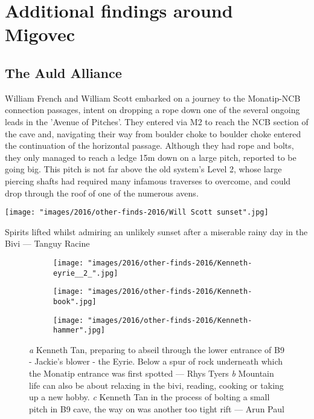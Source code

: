 \section{Additional findings around Migovec}

\subsection{The Auld Alliance}
William French and William Scott embarked on a journey to the Monatip-NCB connection passages, intent on dropping a rope down one of the several ongoing leads in the 'Avenue of Pitches'. They entered via M2 to reach the NCB section of the cave and, navigating their way from boulder choke to boulder choke entered the continuation of the horizontal passage. Although they had rope and bolts, they only managed to reach a ledge 15m down on a large pitch, reported to be going big. This pitch is not far above the old system's Level 2, whose large piercing shafts had required many infamous traverses to overcome, and could drop through the roof of one of the numerous avens.

\begin{marginfigure}
\checkoddpage \ifoddpage \forcerectofloat \else \forceversofloat \fi
\centering
 \texttt{[image: "images/2016/other-finds-2016/Will Scott sunset".jpg]} 
 \caption{Spirits lifted whilst admiring an unlikely sunset after a miserable rainy day in the Bivi --- Tanguy Racine}
 \label{Sunset}
\end{marginfigure}


\begin{figure*}[t!]
\checkoddpage \ifoddpage \forcerectofloat \else \forceversofloat \fi
\centering

    \begin{subfigure}[t]{0.5435\textwidth}
        \centering
        \texttt{[image: "images/2016/other-finds-2016/Kenneth-eyrie\_\_2\_".jpg]} 
        \caption{} \label{moon door}
    \end{subfigure}
        \hfill
\begin{subfigure}[t]{0.4465\textwidth}
\centering
\texttt{[image: "images/2016/other-finds-2016/Kenneth-book".jpg]}
 \caption{}\label{reading in the bivi}
\end{subfigure}
    \vspace{0cm}
    \begin{subfigure}[t]{\textwidth}
    \centering
        \texttt{[image: "images/2016/other-finds-2016/Kenneth-hammer".jpg]} 
        \caption{} \label{hammer in B9}
    \end{subfigure}
    \caption{
    \emph{a}  Kenneth Tan, preparing to abseil through the lower entrance of B9 - Jackie's blower - the Eyrie. Below a spur of rock underneath which the Monatip entrance was first spotted --- Rhys Tyers
     \emph{b} Mountain life can also be about relaxing in the bivi, reading, cooking or taking up a new hobby.
     \emph{c}  Kenneth Tan in the process of bolting a small pitch in B9 cave, the way on was another too tight rift --- Arun Paul }
\end{figure*}

